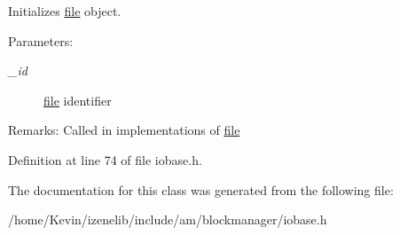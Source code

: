 Initializes \hyperlink{classfile}{file} object. 

\begin{Desc}
\item[Parameters:]
\begin{description}
\item[{\em \_\-id}]\hyperlink{classfile}{file} identifier \end{description}
\end{Desc}
\begin{Desc}
\item[Remarks:]Called in implementations of \hyperlink{classfile}{file} \end{Desc}


Definition at line 74 of file iobase.h.

The documentation for this class was generated from the following file:\begin{CompactItemize}
\item 
/home/Kevin/izenelib/include/am/blockmanager/iobase.h\end{CompactItemize}
